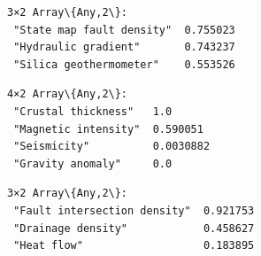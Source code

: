 \documentclass[11pt]{article}
\begin{document}
    
    
    \begin{Verbatim}[commandchars=\\\{\}]
3×2 Array\{Any,2\}:
 "State map fault density"  0.755023
 "Hydraulic gradient"       0.743237
 "Silica geothermometer"    0.553526
    \end{Verbatim}

    
    
    \begin{Verbatim}[commandchars=\\\{\}]
4×2 Array\{Any,2\}:
 "Crustal thickness"   1.0
 "Magnetic intensity"  0.590051
 "Seismicity"          0.0030882
 "Gravity anomaly"     0.0
    \end{Verbatim}

    
    
    \begin{Verbatim}[commandchars=\\\{\}]
3×2 Array\{Any,2\}:
 "Fault intersection density"  0.921753
 "Drainage density"            0.458627
 "Heat flow"                   0.183895
    \end{Verbatim}

    
    \begin{center}
    \end{center}
    { \hspace*{\fill} \\}
    
    \begin{Verbatim}[commandchars=\\\{\}]

    \end{Verbatim}
\end{document}
